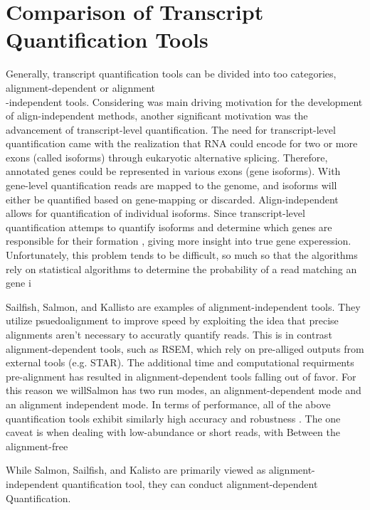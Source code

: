 \documentclass{article}
\begin{document}
\section{Comparison of Transcript Quantification Tools}
\indent Generally, transcript quantification tools can be divided into too categories, alignment-dependent or alignment\\-independent tools.
Considering was main driving motivation for the development of align-independent methods, another significant motivation was the advancement of transcript-level quantification. The need for transcript-level quantification came with the realization that RNA could encode for two or more exons
(called isoforms) through eukaryotic alternative splicing. Therefore, annotated genes could be represented in various exons (gene isoforms).
With gene-level quantification reads are mapped to the genome, and isoforms will either be quantified based on gene-mapping or discarded. Align-independent allows for quantification of individual isoforms. Since transcript-level quantification attemps to quantify isoforms and determine which genes are responsible for their formation , giving more
insight into true gene experession. Unfortunately, this problem tends to be difficult, so much so that the algorithms rely on statistical algorithms to determine the probability of a read matching an gene i 

\indent  Sailfish, Salmon, and Kallisto are examples of alignment-independent tools. 
They utilize psuedoalignment to improve speed by exploiting the idea that precise alignments aren't necessary to accuratly quantify reads. 
This is in contrast alignment-dependent tools, such as RSEM, which rely on pre-alliged outputs from external tools (e.g. STAR). 
The additional time and computational requirments pre-alignment has resulted in alignment-dependent tools falling out of favor.
For this reason we willSalmon has two run modes, an alignment-dependent mode and an alignment independent mode.
In terms of performance, all of the above quantification tools exhibit similarly high accuracy and robustness \cite{Zhang:2017aa}. The one caveat is when dealing with low-abundance or short reads, with 
Between the alignment-free 

\begin{info} %
	While Salmon, Sailfish, and Kalisto are primarily viewed as alignment-independent quantification tool, they can conduct alignment-dependent Quantification.
\end{info}
\end{document}
